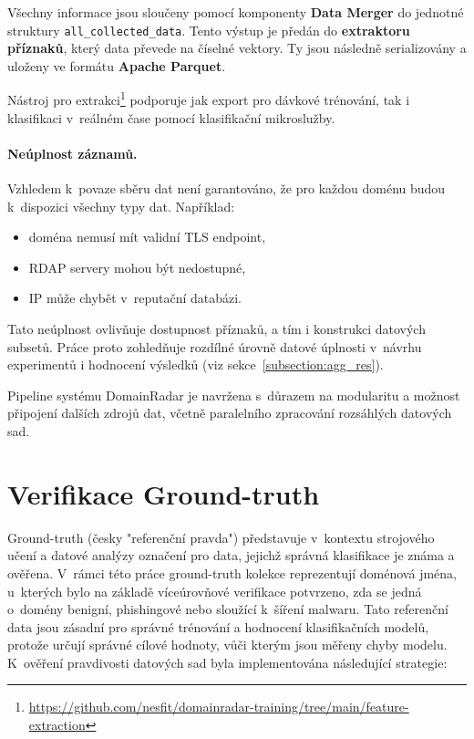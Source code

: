 Všechny informace jsou sloučeny pomocí komponenty \textbf{Data Merger} do jednotné struktury \texttt{all\_collected\_data}. Tento výstup je předán do \textbf{extraktoru příznaků}, který data převede na číselné vektory. Ty jsou následně serializovány a uloženy ve formátu \textbf{Apache Parquet}.

Nástroj pro extrakci\footnote{\url{https://github.com/nesfit/domainradar-training/tree/main/feature-extraction}} podporuje jak export pro dávkové trénování, tak i klasifikaci v~reálném čase pomocí klasifikační mikroslužby.


\paragraph{Neúplnost záznamů.}

Vzhledem k~povaze sběru dat není garantováno, že pro každou doménu budou k~dispozici všechny typy dat. Například:

\begin{itemize}
    \item doména nemusí mít validní TLS endpoint,
    \item RDAP servery mohou být nedostupné,
    \item IP může chybět v~reputační databázi.
\end{itemize}

Tato neúplnost ovlivňuje dostupnost příznaků, a tím i konstrukci datových subsetů. Práce proto zohledňuje rozdílné úrovně datové úplnosti v~návrhu experimentů i hodnocení výsledků (viz sekce~\ref{subsection:agg_res}).

Pipeline systému DomainRadar je navržena s~důrazem na modularitu a možnost připojení dalších zdrojů dat, včetně paralelního zpracování rozsáhlých datových sad.


\section{Verifikace Ground-truth} \label{pravda}
Ground-truth (česky "referenční pravda") představuje v~kontextu strojového učení a datové analýzy označení pro data, jejichž správná klasifikace je známa a ověřena. V~rámci této práce ground-truth kolekce reprezentují doménová jména, u~kterých bylo na základě víceúrovňové verifikace potvrzeno, zda se jedná o~domény benigní, phishingové nebo sloužící k~šíření malwaru. Tato referenční data jsou zásadní pro správné trénování a hodnocení klasifikačních modelů, protože určují správné cílové hodnoty, vůči kterým jsou měřeny chyby modelu. K~ověření pravdivosti datových sad byla implementována následující strategie: \cite{petr}

